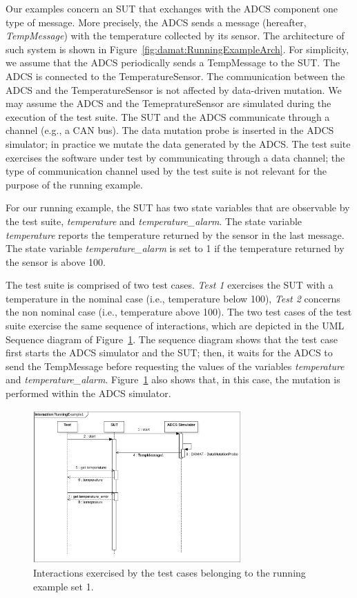 Our examples concern an SUT that exchanges with the ADCS component one type of message. More precisely, the ADCS sends a message (hereafter, \emph{TempMessage}) with the temperature collected by its sensor. The architecture of such system is shown in Figure~\ref{fig:damat:RunningExampleArch}. For simplicity, we assume that the ADCS periodically sends a TempMessage to the SUT. The ADCS is connected to the TemperatureSensor. The communication between the ADCS and the TemperatureSensor is not affected by data-driven mutation. We may assume the ADCS and the TemepratureSensor are simulated during the execution of the test suite. The SUT and the ADCS communicate through a channel
(e.g., a CAN bus). The data mutation probe is inserted in the ADCS simulator; in practice we mutate the data generated by the ADCS. The test suite exercises the software under test by communicating through a data channel; the type of communication channel used by the test suite is not relevant for the purpose of the running example.

For our running example, the SUT has two state variables that are observable by the test suite, \emph{temperature} and \emph{temperature\_alarm}. The state variable \emph{temperature} reports the temperature returned by the sensor in the last message.
The state variable \emph{temperature\_alarm} is set to 1 if the temperature returned by the sensor is above 100.

The test suite is comprised of two test cases. \emph{Test 1} exercises the SUT with a temperature in the nominal case (i.e., temperature below 100), \emph{Test 2} concerns the non nominal case (i.e., temperature above 100). The two test cases of the test suite exercise the same sequence of interactions, which are depicted in the UML Sequence diagram of Figure~\ref{fig:damat:RunningExample1Sequence}. The sequence diagram shows that the test case first starts the ADCS simulator and the SUT; then, it waits for the ADCS to send the TempMessage before requesting the values of the variables \emph{temperature} and \emph{temperature\_alarm}. Figure~\ref{fig:damat:RunningExample1Sequence} also shows that, in this case, the mutation is performed within the ADCS simulator.

\begin{figure}[tb]
\centering
\includegraphics[width=8cm]{damat/images/runningExamplesSequence1.png}
\caption{Interactions exercised by the test cases belonging to the running example set 1.}
\label{fig:damat:RunningExample1Sequence}
\end{figure}


